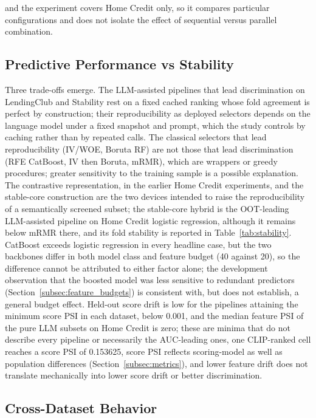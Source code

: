\documentclass[final,5p,twocolumn]{elsarticle}
\begin{document}
and the experiment covers Home Credit only, so it compares particular configurations and does not isolate the effect of sequential versus parallel combination.

\subsection{Predictive Performance vs Stability}
\label{subsec:performance_vs_stability}

Three trade-offs emerge. The LLM-assisted pipelines that lead discrimination on LendingClub and Stability rest on a fixed cached ranking whose fold agreement is perfect by construction; their reproducibility as deployed selectors depends on the language model under a fixed snapshot and prompt, which the study controls by caching rather than by repeated calls. The classical selectors that lead reproducibility (IV/WOE, Boruta RF) are not those that lead discrimination (RFE CatBoost, IV then Boruta, mRMR), which are wrappers or greedy procedures; greater sensitivity to the training sample is a possible explanation. The contrastive representation, in the earlier Home Credit experiments, and the stable-core construction are the two devices intended to raise the reproducibility of a semantically screened subset; the stable-core hybrid is the OOT-leading LLM-assisted pipeline on Home Credit logistic regression, although it remains below mRMR there, and its fold stability is reported in Table~\ref{tab:stability}. CatBoost exceeds logistic regression in every headline case, but the two backbones differ in both model class and feature budget (40 against 20), so the difference cannot be attributed to either factor alone; the development observation that the boosted model was less sensitive to redundant predictors (Section~\ref{subsec:feature_budgets}) is consistent with, but does not establish, a general budget effect. Held-out score drift is low for the pipelines attaining the minimum score PSI in each dataset, below 0.001, and the median feature PSI of the pure LLM subsets on Home Credit is zero; these are minima that do not describe every pipeline or necessarily the AUC-leading ones, one CLIP-ranked cell reaches a score PSI of 0.153625, score PSI reflects scoring-model as well as population differences (Section~\ref{subsec:metrics}), and lower feature drift does not translate mechanically into lower score drift or better discrimination.

\subsection{Cross-Dataset Behavior}
\label{subsec:cross_dataset}
\end{document}
